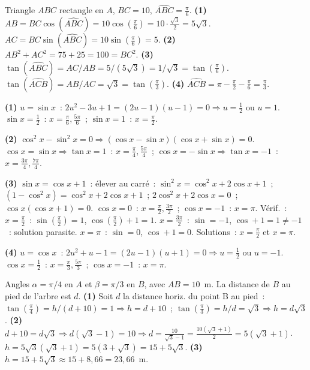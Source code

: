 
Triangle $ABC$ rectangle en $A$, $BC=10$, $\widehat{ABC}=\frac{\pi}{6}$.
\textbf{(1)} $AB=BC\cos(\widehat{ABC})=10\cos(\frac{\pi}{6})=10\cdot\frac{\sqrt{3}}{2}=5\sqrt{3}$.
$AC=BC\sin(\widehat{ABC})=10\sin(\frac{\pi}{6})=5$.
\textbf{(2)} $AB^2+AC^2=75+25=100=BC^2$.\checkmark
\textbf{(3)} $\tan(\widehat{ABC})=AC/AB=5/(5\sqrt{3})=1/\sqrt{3}=\tan(\frac{\pi}{6})$.\checkmark
$\tan(\widehat{ACB})=AB/AC=\sqrt{3}=\tan(\frac{\pi}{3})$.
\textbf{(4)} $\widehat{ACB}=\pi-\frac{\pi}{2}-\frac{\pi}{6}=\frac{\pi}{3}$.\checkmark


\textbf{(1)} $u=\sin x$~: $2u^2-3u+1=(2u-1)(u-1)=0\Rightarrow u=\frac{1}{2}$ ou $u=1$.
$\sin x=\frac{1}{2}$~: $x=\frac{\pi}{6},\frac{5\pi}{6}$~; $\sin x=1$~: $x=\frac{\pi}{2}$.

\textbf{(2)} $\cos^2x-\sin^2x=0\Rightarrow(\cos x-\sin x)(\cos x+\sin x)=0$.
$\cos x=\sin x\Rightarrow\tan x=1$~: $x=\frac{\pi}{4},\frac{5\pi}{4}$~;
$\cos x=-\sin x\Rightarrow\tan x=-1$~: $x=\frac{3\pi}{4},\frac{7\pi}{4}$.

\textbf{(3)} $\sin x=\cos x+1$~: \'elever au carr\'e~: $\sin^2x=\cos^2x+2\cos x+1$~;
$(1-\cos^2x)=\cos^2x+2\cos x+1$~; $2\cos^2x+2\cos x=0$~; $\cos x(\cos x+1)=0$.
$\cos x=0$~: $x=\frac{\pi}{2},\frac{3\pi}{2}$~; $\cos x=-1$~: $x=\pi$.
V\'erif.~: $x=\frac{\pi}{2}$~: $\sin(\frac{\pi}{2})=1$, $\cos(\frac{\pi}{2})+1=1$.\checkmark
$x=\frac{3\pi}{2}$~: $\sin=-1$, $\cos+1=1\ne-1$~: solution parasite.\quad
$x=\pi$~: $\sin=0$, $\cos+1=0$.\checkmark
Solutions~: $x=\frac{\pi}{2}$ et $x=\pi$.

\textbf{(4)} $u=\cos x$~: $2u^2+u-1=(2u-1)(u+1)=0\Rightarrow u=\frac{1}{2}$ ou $u=-1$.
$\cos x=\frac{1}{2}$~: $x=\frac{\pi}{3},\frac{5\pi}{3}$~; $\cos x=-1$~: $x=\pi$.


Angles $\alpha=\pi/4$ en $A$ et $\beta=\pi/3$ en $B$, avec $AB=10$~m.
La distance de $B$ au pied de l'arbre est $d$.
\textbf{(1)} Soit $d$ la distance horiz. du point B au pied~:
$\tan(\frac{\pi}{4})=h/(d+10)=1\Rightarrow h=d+10$~;
$\tan(\frac{\pi}{3})=h/d=\sqrt{3}\Rightarrow h=d\sqrt{3}$.
\textbf{(2)} $d+10=d\sqrt{3}\Rightarrow d(\sqrt{3}-1)=10\Rightarrow d=\frac{10}{\sqrt{3}-1}=\frac{10(\sqrt{3}+1)}{2}=5(\sqrt{3}+1)$.
$h=5\sqrt{3}(\sqrt{3}+1)=5(3+\sqrt{3})=15+5\sqrt{3}$.
\textbf{(3)} $h=15+5\sqrt{3}\approx15+8{,}66=23{,}66$~m.

